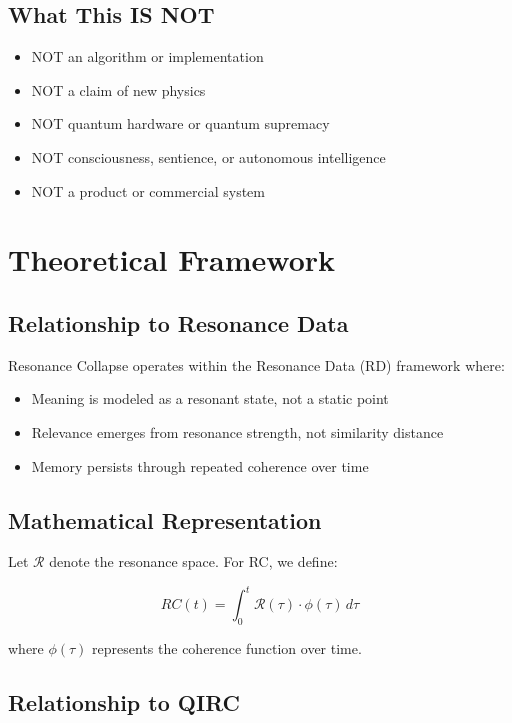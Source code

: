 \documentclass[12pt,a4paper]{article}
\begin{document}
\subsection{What This IS NOT}
\begin{itemize}
    \item NOT an algorithm or implementation
    \item NOT a claim of new physics
    \item NOT quantum hardware or quantum supremacy
    \item NOT consciousness, sentience, or autonomous intelligence
    \item NOT a product or commercial system
\end{itemize}

\section{Theoretical Framework}

\subsection{Relationship to Resonance Data}

Resonance Collapse operates within the Resonance Data (RD) framework where:
\begin{itemize}
    \item Meaning is modeled as a resonant state, not a static point
    \item Relevance emerges from resonance strength, not similarity distance
    \item Memory persists through repeated coherence over time
\end{itemize}

\subsection{Mathematical Representation}

Let $\mathcal{R}$ denote the resonance space. For RC, we define:

\[
RC(t) = \int_{0}^{t} \mathcal{R}(\tau) \cdot \phi(\tau) \, d\tau
\]

where $\phi(\tau)$ represents the coherence function over time.

\subsection{Relationship to QIRC}
\end{document}
